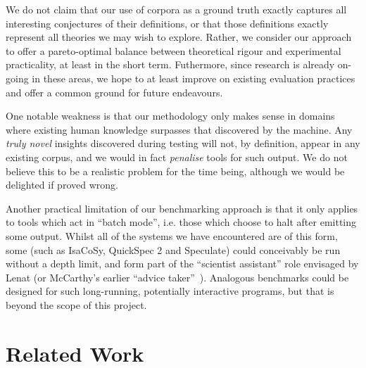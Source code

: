 We do not claim that our use of corpora as a ground truth exactly captures all
interesting conjectures of their definitions, or that those definitions exactly
represent all theories we may wish to explore. Rather, we consider our approach
to offer a pareto-optimal balance between theoretical rigour and experimental
practicality, at least in the short term. Futhermore, since research is already
on-going in these areas, we hope to at least improve on existing evaluation
practices and offer a common ground for future endeavours.

One notable weakness is that our methodology only makes sense in domains where
existing human knowledge surpasses that discovered by the machine. Any
\emph{truly novel} insights discovered during testing will not, by definition,
appear in any existing corpus, and we would in fact \emph{penalise} tools for
such output. We do not believe this to be a realistic problem for the time
being, although we would be delighted if proved wrong. %

Another practical limitation of our benchmarking approach is that it only
applies to tools which act in ``batch mode'', i.e. those which choose to halt
after emitting some output. Whilst all of the systems we have encountered are of
this form, some (such as IsaCoSy, QuickSpec 2 and Speculate) could conceivably
be run without a depth limit, and form part of the ``scientist assistant'' role
envisaged by Lenat (or McCarthy's earlier ``advice
taker''~\cite{McCarthy_Programs59}). Analogous benchmarks could be designed for
such long-running, potentially interactive programs, but that is beyond the
scope of this project.

\section{Related Work}
\label{sec:related-work}

